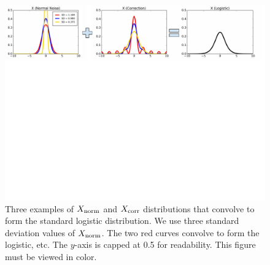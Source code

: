 \documentclass{article}
\begin{document}
\begin{figure}[t]
    \centering
    \includegraphics[width=1\textwidth]{mh_convolution_diagram_v2}
    \caption{
    Three examples of $X_{\rm norm}$ and $X_{\rm corr}$ distributions that convolve to form the
    standard logistic distribution. We use three standard deviation values of $X_{\rm norm}$. The
    two red curves convolve to form the logistic, etc. The $y$-axis is capped at 0.5 for
    readability. This figure must be viewed in color.
    }
    \label{fig:deconvolution}
\end{figure}

\end{document}
